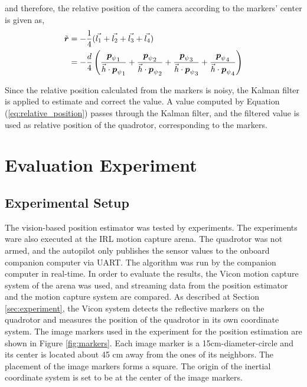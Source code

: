 and therefore, the relative position of the camera according to the markers' center is given as, \\
\begin{equation}
\label{eq:relative_position}
\begin{aligned}
{\tilde {\boldsymbol r}}
& = - {1\over 4} (\vec{l_1} + \vec{l_2} + \vec{l_3} + \vec{l_4}) \\
& =  - {d \over 4} \left( { {{{\boldsymbol p}_{\psi}}_1}\over {\vec{h} \cdot {{\boldsymbol p}_{\psi}}_1} }+ { {{{\boldsymbol p}_{\psi}}_2}\over {\vec{h} \cdot {{\boldsymbol p}_{\psi}}_2} } + { {{{\boldsymbol p}_{\psi}}_3}\over {\vec{h} \cdot {{\boldsymbol p}_{\psi}}_3} } +{ {{{\boldsymbol p}_{\psi}}_4}\over {\vec{h} \cdot {{\boldsymbol p}_{\psi}}_4} } \right)
\end{aligned}
\end{equation}

Since the relative position calculated from the markers is noisy, the Kalman filter is applied to estimate and correct the value. A value computed by Equation (\ref{eq:relative_position}) passes through the Kalman filter, and the filtered value is used as relative position of the quadrotor, corresponding to the markers.

\section{Evaluation Experiment}
\subsection{Experimental Setup}
The vision-based position estimator was tested by experiments. The experiments ware also executed at the IRL motion capture arena. The quadrotor was not armed, and the autopilot only publishes the sensor values to the onboard companion computer via UART. The algorithm was run by the companion computer in real-time. In order to evaluate the results, the Vicon motion capture system of the arena was used, and streaming data from the position estimator and the motion capture system are compared. As described at Section \ref{sec:experiment}, the Vicon system detects the reflective markers on the quadrotor and measures the position of the quadrotor in its own coordinate system. The image markers used in the experiment for the position estimation are shown in Figure \ref{fig:markers}. Each image marker is a 15cm-diameter-circle and its center is located about 45 cm away from the ones of its neighbors. The placement of the image markers forms a square. The origin of the inertial coordinate system is set to be at the center of the image markers.

